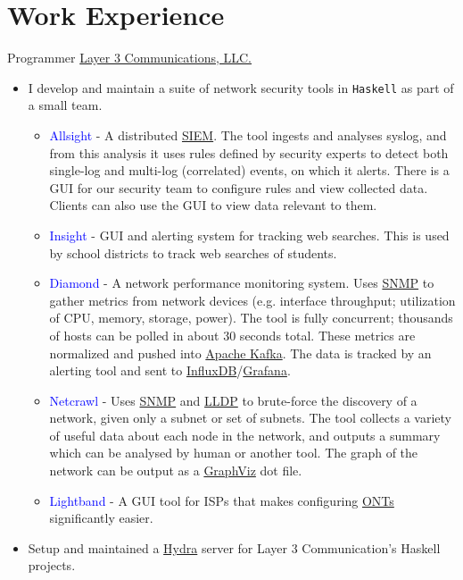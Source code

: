 \documentclass[10pt,letterpaper,sans]{moderncv}
\newcommand{\wlink}[2]{\textcolor[HTML]{461645}{\href{#1}{#2}}}
\newcommand{\lang}[1]{\texttt{#1}}
\begin{document}
\makecvtitle{}


\section{Work Experience}
  {Programmer}
  {\wlink{https://layer3com.com}{Layer 3 Communications, LLC.}}
  {}
  {}
  {
\begin{itemize}
  \item I develop and maintain a suite of network security tools in \lang{Haskell} as part of a small team.
  \begin{itemize}
    \item \textcolor{blue}{Allsight} - A distributed \wlink{https://en.wikipedia.org/wiki/Security_information_and_event_management}{SIEM}. The tool ingests and analyses syslog, and from this analysis it uses rules defined by security experts to detect both single-log and multi-log (correlated) events, on which it alerts. There is a GUI for our security team to configure rules and view collected data. Clients can also use the GUI to view data relevant to them.
    \item \textcolor{blue}{Insight} - GUI and alerting system for tracking web searches. This is used by school districts to track web searches of students.
    \item \textcolor{blue}{Diamond} - A network performance monitoring system. Uses \wlink{https://en.wikipedia.org/wiki/Simple_Network_Management_Protocol}{SNMP} to gather metrics from network devices (e.g. interface throughput; utilization of CPU, memory, storage, power). The tool is fully concurrent; thousands of hosts can be polled in about 30 seconds total. These metrics are normalized and pushed into \wlink{https://kafka.apache.org/}{Apache Kafka}. The data is tracked by an alerting tool and sent to \wlink{https://www.influxdata.com/}{InfluxDB}/\wlink{https://grafana.com/}{Grafana}.
    \item \textcolor{blue}{Netcrawl} - Uses \wlink{https://en.wikipedia.org/wiki/Simple_Network_Management_Protocol}{SNMP} and \wlink{https://en.wikipedia.org/wiki/Link_Layer_Discovery_Protocol}{LLDP} to brute-force the discovery of a network, given only a subnet or set of subnets. The tool collects a variety of useful data about each node in the network, and outputs a summary which can be analysed by human or another tool. The graph of the network can be output as a \wlink{http://www.graphviz.org/}{GraphViz} dot file.
    \item \textcolor{blue}{Lightband} - A GUI tool for ISPs that makes configuring \wlink{https://en.wikipedia.org/wiki/Network_interface_device\#Optical_network_terminals}{ONTs} significantly easier.
  \end{itemize}
  \item Setup and maintained a \wlink{https://nixos.org/hydra/}{Hydra} server for Layer 3 Communication's Haskell projects.
\end{itemize}
}
\end{document}
